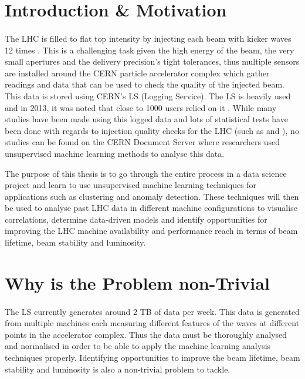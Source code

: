 \documentclass[12pt, twoside]{report}
\begin{document}
	\section{Introduction \& Motivation}	
	\paragraph{ }The LHC is filled to flat top intensity by injecting each beam with kicker waves 12 times \cite{r:BeamQC}. This is a challenging task given the high energy of the beam, the very small apertures and the delivery precision's tight tolerances, thus multiple sensors are installed around the CERN particle accelerator complex \cite{r:Diagram} which gather readings and data that can be used to check the quality of the injected beam. This data is stored using CERN's LS (Logging Service). The LS is heavily used and in 2013, it was noted that close to 1000 users relied on it \cite{r:LS}. While many studies have been made using this logged data and lots of statistical tests have been done with regards to injection quality checks for the LHC (such as \cite{r:AutomaticIQCChecks} and \cite{r:BeamQC}), no studies can be found on the CERN Document Server \cite{r:CERNDocumentServer} where researchers used unsupervised machine learning methods to analyse this data.
	\par The purpose of this thesis is to go through the entire process in a data science project and learn to use unsupervised machine learning techniques for applications such as clustering and anomaly detection. These techniques will then be used to analyse past LHC data in different machine configurations to visualise correlations, determine data-driven models and identify opportunities for improving the LHC machine availability and performance reach in terms of beam lifetime, beam stability and luminosity.
	
	\section{Why is the Problem non-Trivial}
	
	\paragraph{ }The LS currently generates around 2 TB of data per week. This data is generated from multiple machines each measuring different features of the waves at different points in the accelerator complex. Thus the data must be thoroughly analysed and normalised in order to be able to apply the machine learning analysis techniques properly. Identifying opportunities to improve the beam lifetime, beam stability and luminosity is also a non-trivial problem to tackle.
	
\end{document}

